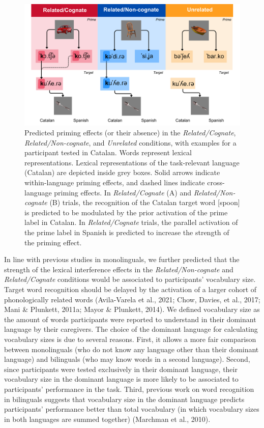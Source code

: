 \documentclass[
  12pt,
  b5paperpaper,
  twoside]{scrreprt}
\begin{document}
\begin{figure}

{\centering \includegraphics{chapters/../_assets/img/hypotheses.png}

}

\caption{\label{fig-hypotheses}Predicted priming effects (or their
absence) in the \emph{Related/Cognate}, \emph{Related/Non-cognate}, and
\emph{Unrelated} conditions, with examples for a participant tested in
Catalan. Words represent lexical representations. Lexical
representations of the task-relevant language (Catalan) are depicted
inside grey boxes. Solid arrows indicate within-language priming
effects, and dashed lines indicate cross-language priming effects. In
\emph{Related/Cognate} (A) and \emph{Related/Non-cognate} (B) trials,
the recognition of the Catalan target word 
{[}spoon{]} is predicted to be modulated by the prior activation of the
prime label in Catalan. In \emph{Related/Cognate} trials, the parallel
activation of the prime label in Spanish is predicted to increase the
strength of the priming effect.}

\end{figure}

In line with previous studies in monolinguals, we further predicted that
the strength of the lexical interference effects in the
\emph{Related/Non-cognate} and \emph{Related/Cognate} conditions would
be associated to participants' vocabulary size. Target word recognition
should be delayed by the activation of a larger cohort of phonologically
related words (Avila-Varela et al., 2021; Chow, Davies, et al., 2017;
Mani \& Plunkett, 2011a; Mayor \& Plunkett, 2014). We defined vocabulary
size as the amount of words participants were reported to understand in
their dominant language by their caregivers. The choice of the dominant
language for calculating vocabulary sizes is due to several reasons.
First, it allows a more fair comparison between monolinguals (who do not
know any language other than their dominant language) and bilinguals
(who may know words in a second language). Second, since participants
were tested exclusively in their dominant language, their vocabulary
size in the dominant language is more likely to be associated to
participants' performance in the task. Third, previous work on word
recognition in bilinguals suggests that vocabulary size in the dominant
language predicts participants' performance better than total vocabulary
(in which vocabulary sizes in both languages are summed together)
(Marchman et al., 2010).
\end{document}
